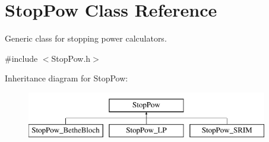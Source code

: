 \hypertarget{class_stop_pow}{\section{Stop\-Pow Class Reference}
\label{class_stop_pow}
}


Generic class for stopping power calculators.  




{\ttfamily \#include $<$Stop\-Pow.\-h$>$}

Inheritance diagram for Stop\-Pow\-:\begin{figure}[H]
\begin{center}
\leavevmode
\includegraphics[height=2.000000cm]{class_stop_pow}
\end{center}
\end{figure}
